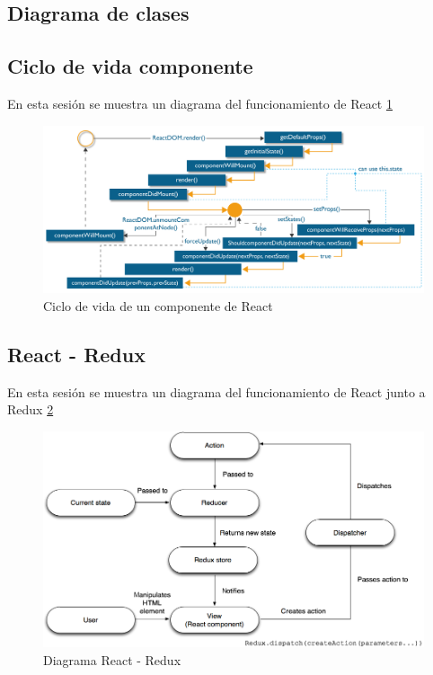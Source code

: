 \subsection {Diagrama de clases}
\subsection {Ciclo de vida componente}
En esta sesión se muestra un diagrama del funcionamiento de React \ref{fig:react}
\begin{figure}
  \begin{center}
    \includegraphics[width=\textwidth]{imagenes/ReactDOM_edureka.png}
    \caption{Ciclo de vida de un componente de React}
    \label{fig:react}
  \end{center}
\end{figure}

\subsection {React - Redux}
En esta sesión se muestra un diagrama del funcionamiento de React junto a Redux \ref{fig:react_redux}
\begin{figure}
  \begin{center}
    \includegraphics[width=\textwidth]{imagenes/react_redux.png}
    \caption{Diagrama React - Redux}
    \label{fig:react_redux}
  \end{center}
\end{figure}


  
